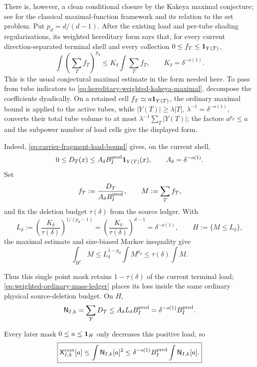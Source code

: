\documentclass[11pt]{article}
\begin{document}
There is, however, a clean conditional closure by the Kakeya maximal
conjecture; see \cite{Wolff95,KatzTao02,ZahlKakeyaSurvey} for the classical
maximal-function framework and its relation to the set problem.  Put
\(p_d=d/(d-1)\).  After the existing load and per-tube
shading regularizations, its weighted hereditary form says that, for every
current direction-separated terminal shell and every collection
\(0\le f_T\le{\bf1}_{Y(T)}\),
\begin{equation}\label{eq:hereditary-weighted-kakeya-maximal}
 \boxed{
  \int\left(\sum_Tf_T\right)^{p_d}
  \le K_\delta\int\sum_Tf_T,
  \qquad K_\delta=\delta^{-o(1)}.}
\end{equation}
This is the usual conjectural maximal estimate in the form needed here.  To
pass from tube indicators to \eqref{eq:hereditary-weighted-kakeya-maximal},
decompose the coefficients dyadically.  On a retained cell
\(f_T\simeq a{\bf1}_{Y(T)}\), the ordinary maximal bound is applied to the
active tubes, while
\(|Y(T)|\ge\lambda|T|\), \(\lambda^{-1}=\delta^{-o(1)}\), converts their total
tube volume to at most \(\lambda^{-1}\sum_T|Y(T)|\); the factors \(a^{p_d}\le
a\) and the subpower number of load cells give the displayed form.

Indeed, \eqref{eq:carrier-fragment-load-bound} gives, on the current shell,
\[
 0\le D_T(x)\le A_\delta B_I^{\rm pred}{\bf1}_{Y(T)}(x),
 \qquad A_\delta=\delta^{-o(1)}.
\]
Set
\[
 f_T:=\frac{D_T}{A_\delta B_I^{\rm pred}},
 \qquad M:=\sum_Tf_T,
\]
and fix the deletion budget \(\tau(\delta)\) from the source ledger.  With
\begin{equation}\label{eq:maximal-pruning-threshold}
 L_\delta:=\left(\frac{K_\delta}{\tau(\delta)}\right)^{1/(p_d-1)}
 =\left(\frac{K_\delta}{\tau(\delta)}\right)^{d-1}
 =\delta^{-o(1)},
 \qquad H:=\{M\le L_\delta\},
\end{equation}
the maximal estimate and size-biased Markov inequality give
\begin{equation}\label{eq:maximal-pruning-retained-mass}
 \int_{H^c}M
 \le L_\delta^{1-p_d}\int M^{p_d}
 \le\tau(\delta)\int M.
\end{equation}

Thus this single point mask retains \(1-\tau(\delta)\) of the current terminal
load; \eqref{eq:weighted-ordinary-mass-ledger} places its loss inside the same
ordinary physical source-deletion budget.  On \(H\),
\[
 \mathsf N_{I,k}=\sum_TD_T
 \le A_\delta L_\delta B_I^{\rm pred}
 =\delta^{-o(1)}B_I^{\rm pred}.
\]

Every later mask \(0\le a\le{\bf1}_H\) only decreases this positive load, so
\begin{equation}\label{eq:maximal-implies-root-gate}
 \boxed{
 \mathsf X_{I,k}^{\rm root}[a]
 \le\int\mathsf N_{I,k}[a]^2
 \le\delta^{-o(1)}B_I^{\rm pred}
       \int\mathsf N_{I,k}[a].}
\end{equation}
\end{document}
